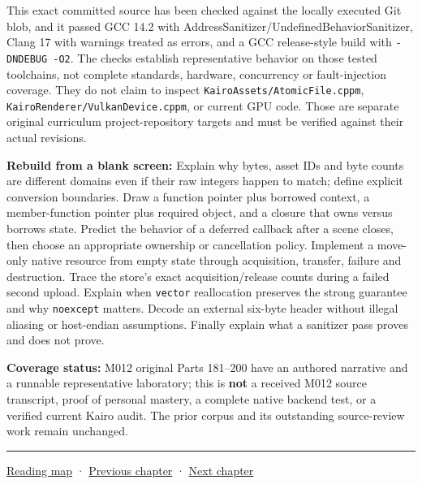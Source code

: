 This exact committed source has been checked against the locally executed Git blob, and it passed GCC 14.2 with AddressSanitizer/UndefinedBehaviorSanitizer, Clang 17 with warnings treated as errors, and a GCC release-style build with \texttt{-DNDEBUG\ -O2}. The checks establish representative behavior on those tested toolchains, not complete standards, hardware, concurrency or fault-injection coverage. They do not claim to inspect \texttt{KairoAssets/AtomicFile.cppm}, \texttt{KairoRenderer/VulkanDevice.cppm}, or current GPU code. Those are separate original curriculum project-repository targets and must be verified against their actual revisions.

\textbf{Rebuild from a blank screen:} Explain why bytes, asset IDs and byte counts are different domains even if their raw integers happen to match; define explicit conversion boundaries. Draw a function pointer plus borrowed context, a member-function pointer plus required object, and a closure that owns versus borrows state. Predict the behavior of a deferred callback after a scene closes, then choose an appropriate ownership or cancellation policy. Implement a move-only native resource from empty state through acquisition, transfer, failure and destruction. Trace the store's exact acquisition/release counts during a failed second upload. Explain when \texttt{vector} reallocation preserves the strong guarantee and why \texttt{noexcept} matters. Decode an external six-byte header without illegal aliasing or host-endian assumptions. Finally explain what a sanitizer pass proves and does not prove.

\textbf{Coverage status:} M012 original Parts 181--200 have an authored narrative and a runnable representative laboratory; this is \textbf{not} a received M012 source transcript, proof of personal mastery, a complete native backend test, or a verified current Kairo audit. The prior corpus and its outstanding source-review work remain unchanged.

\begin{center}\rule{0.5\linewidth}{0.5pt}\end{center}

\hyperref[volume-reading-map]{Reading map} · \hyperref[05-engine-i-ch003-object-representation-lifetime-and-enforceable-promises]{Previous chapter} · \hyperref[05-engine-i-ch005-generic-asset-pipelines-with-stable-identity]{Next chapter}
